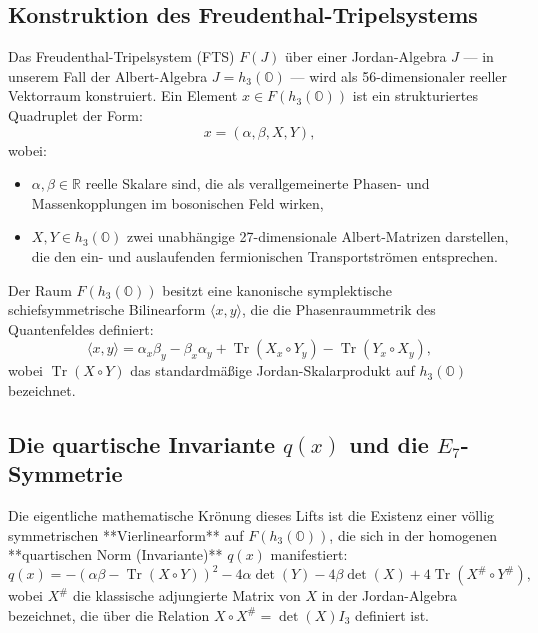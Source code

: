 \documentclass[11pt,a4paper]{article}
\theoremstyle{definition}
\begin{document}
	\subsection{Konstruktion des Freudenthal-Tripelsystems}
	Das Freudenthal-Tripelsystem (FTS) $F(J)$ über einer Jordan-Algebra $J$ — in unserem Fall der Albert-Algebra $J = h_3(\mathbb{O})$ — wird als 56-dimensionaler reeller Vektorraum konstruiert. Ein Element $x \in F(h_3(\mathbb{O}))$ ist ein strukturiertes Quadruplet der Form:
	\begin{equation}
		x = (\alpha, \beta, X, Y),
	\end{equation}
	wobei:
	\begin{itemize}
		\item $\alpha, \beta \in \mathbb{R}$ reelle Skalare sind, die als verallgemeinerte Phasen- und Massenkopplungen im bosonischen Feld wirken,
		\item $X, Y \in h_3(\mathbb{O})$ zwei unabhängige 27-dimensionale Albert-Matrizen darstellen, die den ein- und auslaufenden fermionischen Transportströmen entsprechen.
	\end{itemize}
	
	Der Raum $F(h_3(\mathbb{O}))$ besitzt eine kanonische symplektische schiefsymmetrische Bilinearform $\langle x, y \rangle$, die die Phasenraummetrik des Quantenfeldes definiert:
	\begin{equation}
		\langle x, y \rangle = \alpha_x \beta_y - \beta_x \alpha_y + \operatorname{Tr}(X_x \circ Y_y) - \operatorname{Tr}(Y_x \circ X_y),
	\end{equation}
	wobei $\operatorname{Tr}(X \circ Y)$ das standardmäßige Jordan-Skalarprodukt auf $h_3(\mathbb{O})$ bezeichnet.
	
	\subsection{Die quartische Invariante $q(x)$ und die $E_7$-Symmetrie}
	Die eigentliche mathematische Krönung dieses Lifts ist die Existenz einer völlig symmetrischen **Vierlinearform** auf $F(h_3(\mathbb{O}))$, die sich in der homogenen **quartischen Norm (Invariante)** $q(x)$ manifestiert:
	\begin{equation}
		\label{eq:freudenthal_quartic}
		q(x) = -(\alpha\beta - \operatorname{Tr}(X \circ Y))^2 - 4\alpha\det(Y) - 4\beta\det(X) + 4\operatorname{Tr}(X^\# \circ Y^\#),
	\end{equation}
	wobei $X^\#$ die klassische adjungierte Matrix von $X$ in der Jordan-Algebra bezeichnet, die über die Relation $X \circ X^\# = \det(X) I_3$ definiert ist.
	
\end{document}
